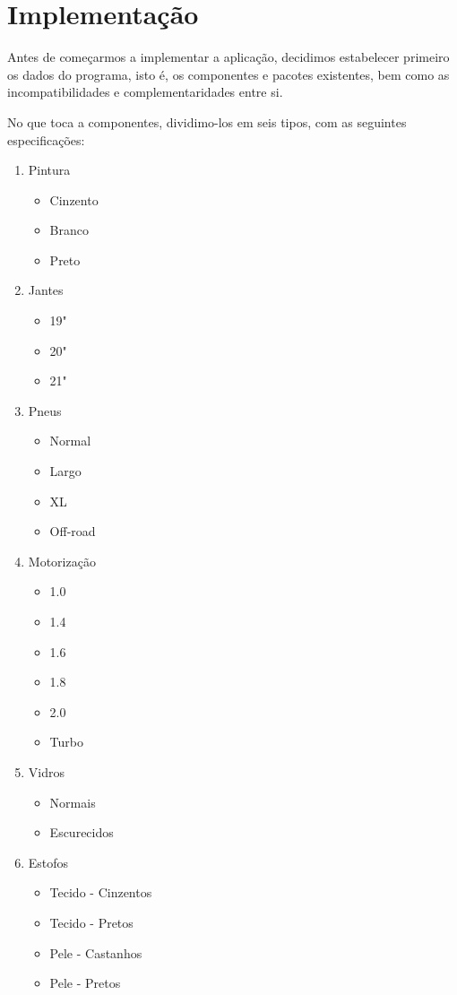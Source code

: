 \section{Implementação}
Antes de começarmos a implementar a aplicação, decidimos estabelecer primeiro os dados do programa, isto é, os componentes e pacotes existentes, bem como as incompatibilidades e complementaridades entre si.

No que toca a componentes, dividimo-los em seis tipos, com as seguintes especificações:
\begin{enumerate}
    \item Pintura \begin{itemize} \item Cinzento \item Branco \item Preto \end{itemize}
    \item Jantes \begin{itemize} \item 19" \item 20" \item 21" \end{itemize}
    \item Pneus \begin{itemize} \item Normal \item Largo \item XL \item Off-road \end{itemize}
    \item Motorização \begin{itemize} \item 1.0 \item 1.4 \item 1.6 \item 1.8 \item 2.0 \item Turbo \end{itemize}
    \item Vidros \begin{itemize} \item Normais \item Escurecidos \end{itemize}
    \item Estofos \begin{itemize} \item Tecido - Cinzentos \item Tecido - Pretos \item Pele - Castanhos \item Pele - Pretos \end{itemize}
\end{enumerate}

